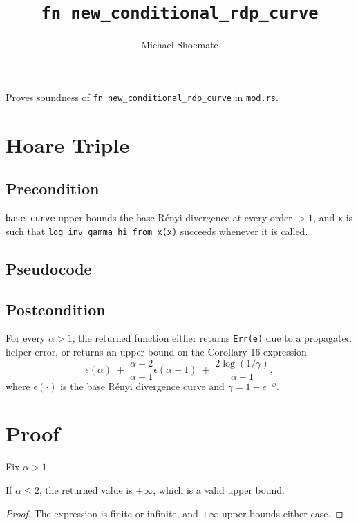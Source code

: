 \documentclass{article}
\title{\texttt{fn new\_conditional\_rdp\_curve}}
\author{Michael Shoemate}
\begin{document}
\maketitle

Proves soundness of \texttt{fn new\_conditional\_rdp\_curve} in \texttt{mod.rs}.

\section{Hoare Triple}
\subsection*{Precondition}
\texttt{base\_curve} upper-bounds the base Rényi divergence at every order $> 1$, and \texttt{x}
is such that \texttt{log\_inv\_gamma\_hi\_from\_x(x)} succeeds whenever it is called.

\subsection*{Pseudocode}


\subsection*{Postcondition}
\begin{theorem}
\label{postcondition}
For every $\alpha > 1$, the returned function either returns \texttt{Err(e)} due to a propagated
helper error, or returns an upper bound on the Corollary 16 expression
\[
\epsilon(\alpha)
\;+\;
\frac{\alpha - 2}{\alpha - 1}\epsilon(\alpha - 1)
\;+\;
\frac{2 \log(1/\gamma)}{\alpha - 1},
\]
where $\epsilon(\cdot)$ is the base Rényi divergence curve and $\gamma = 1 - e^{-x}$.
\end{theorem}

\section{Proof}
Fix $\alpha > 1$.

\begin{lemma}
\label{guard}
If $\alpha \le 2$, the returned value is $+\infty$, which is a valid upper bound.
\end{lemma}

\begin{proof}
The expression is finite or infinite, and $+\infty$ upper-bounds either case.
\end{proof}
\end{document}
